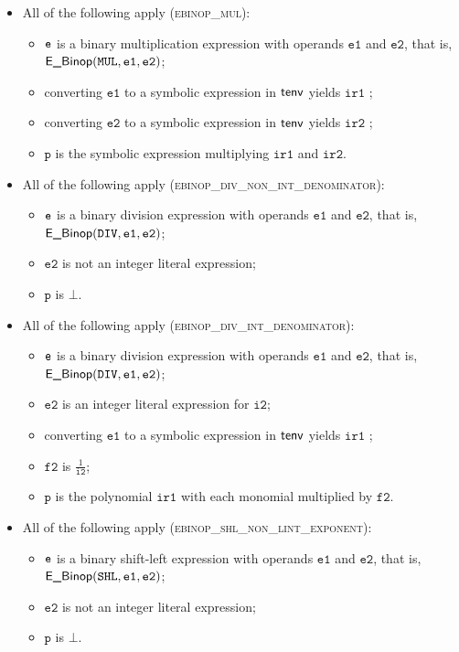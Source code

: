 \documentclass{book}
\newcommand\vitwo[0]{\texttt{i2}}
\newcommand\vftwo[0]{\texttt{f2}}
\newcommand\vp[0]{\texttt{p}}
\newcommand\veone[0]{\texttt{e1}}
\newcommand\vetwo[0]{\texttt{e2}}
\newcommand\irone[0]{\texttt{ir1}}
\newcommand\irtwo[0]{\texttt{ir2}}
\begin{document}
\begin{itemize}
  \item All of the following apply (\textsc{ebinop\_mul}):
  \begin{itemize}
    \item $\texttt{e}$ is a binary multiplication expression with operands $\veone$ and $\vetwo$, that is, \\ $\EBinop(\MUL, \veone, \vetwo)$;
    \item converting $\veone$ to a symbolic expression in $\textsf{tenv}$ yields $\irone$ \ProseOrTypeErrorOrBot;
    \item converting $\vetwo$ to a symbolic expression in $\textsf{tenv}$ yields $\irtwo$ \ProseOrTypeErrorOrBot;
    \item $\vp$ is the symbolic expression multiplying $\irone$ and $\irtwo$.
  \end{itemize}

  \item All of the following apply (\textsc{ebinop\_div\_non\_int\_denominator}):
  \begin{itemize}
    \item $\texttt{e}$ is a binary division expression with operands $\veone$ and $\vetwo$, that is, \\ $\EBinop(\DIV, \veone, \vetwo)$;
    \item $\vetwo$ is not an integer literal expression;
    \item $\vp$ is $\bot$.
  \end{itemize}

  \item All of the following apply (\textsc{ebinop\_div\_int\_denominator}):
  \begin{itemize}
    \item $\texttt{e}$ is a binary division expression with operands $\veone$ and $\vetwo$, that is, \\ $\EBinop(\DIV, \veone, \vetwo)$;
    \item $\vetwo$ is an integer literal expression for $\vitwo$;
    \item converting $\veone$ to a symbolic expression in $\textsf{tenv}$ yields $\irone$ \ProseOrTypeErrorOrBot;
    \item $\vftwo$ is $\frac{1}{\vitwo}$;
    \item $\vp$ is the polynomial $\irone$ with each monomial multiplied by $\vftwo$.
  \end{itemize}

  \item All of the following apply (\textsc{ebinop\_shl\_non\_lint\_exponent}):
  \begin{itemize}
    \item $\texttt{e}$ is a binary shift-left expression with operands $\veone$ and $\vetwo$, that is, \\ $\EBinop(\SHL, \veone, \vetwo)$;
    \item $\vetwo$ is not an integer literal expression;
    \item $\vp$ is $\bot$.
  \end{itemize}


\end{itemize}
\end{document}
